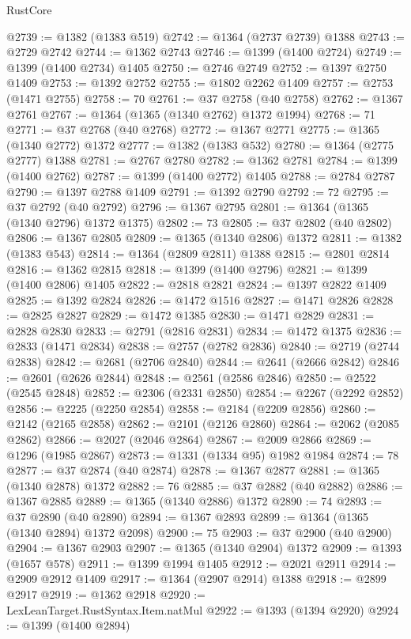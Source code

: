 \begin{lexlean}{RustCore}
\begin{coremodule}
@2739 := @1382 (@1383 @519)
@2742 := @1364 (@2737 @2739) @1388
@2743 := @2729 @2742
@2744 := @1362 @2743
@2746 := @1399 (@1400 @2724)
@2749 := @1399 (@1400 @2734) @1405
@2750 := @2746 @2749
@2752 := @1397 @2750 @1409
@2753 := @1392 @2752
@2755 := @1802 @2262 @1409
@2757 := @2753 (@1471 @2755)
@2758 := 70
@2761 := @37 @2758 (@40 @2758)
@2762 := @1367 @2761
@2767 := @1364 (@1365 (@1340 @2762) @1372 @1994)
@2768 := 71
@2771 := @37 @2768 (@40 @2768)
@2772 := @1367 @2771
@2775 := @1365 (@1340 @2772) @1372
@2777 := @1382 (@1383 @532)
@2780 := @1364 (@2775 @2777) @1388
@2781 := @2767 @2780
@2782 := @1362 @2781
@2784 := @1399 (@1400 @2762)
@2787 := @1399 (@1400 @2772) @1405
@2788 := @2784 @2787
@2790 := @1397 @2788 @1409
@2791 := @1392 @2790
@2792 := 72
@2795 := @37 @2792 (@40 @2792)
@2796 := @1367 @2795
@2801 := @1364 (@1365 (@1340 @2796) @1372 @1375)
@2802 := 73
@2805 := @37 @2802 (@40 @2802)
@2806 := @1367 @2805
@2809 := @1365 (@1340 @2806) @1372
@2811 := @1382 (@1383 @543)
@2814 := @1364 (@2809 @2811) @1388
@2815 := @2801 @2814
@2816 := @1362 @2815
@2818 := @1399 (@1400 @2796)
@2821 := @1399 (@1400 @2806) @1405
@2822 := @2818 @2821
@2824 := @1397 @2822 @1409
@2825 := @1392 @2824
@2826 := @1472 @1516
@2827 := @1471 @2826
@2828 := @2825 @2827
@2829 := @1472 @1385
@2830 := @1471 @2829
@2831 := @2828 @2830
@2833 := @2791 (@2816 @2831)
@2834 := @1472 @1375
@2836 := @2833 (@1471 @2834)
@2838 := @2757 (@2782 @2836)
@2840 := @2719 (@2744 @2838)
@2842 := @2681 (@2706 @2840)
@2844 := @2641 (@2666 @2842)
@2846 := @2601 (@2626 @2844)
@2848 := @2561 (@2586 @2846)
@2850 := @2522 (@2545 @2848)
@2852 := @2306 (@2331 @2850)
@2854 := @2267 (@2292 @2852)
@2856 := @2225 (@2250 @2854)
@2858 := @2184 (@2209 @2856)
@2860 := @2142 (@2165 @2858)
@2862 := @2101 (@2126 @2860)
@2864 := @2062 (@2085 @2862)
@2866 := @2027 (@2046 @2864)
@2867 := @2009 @2866
@2869 := @1296 (@1985 @2867)
@2873 := @1331 (@1334 @95) @1982 @1984
@2874 := 78
@2877 := @37 @2874 (@40 @2874)
@2878 := @1367 @2877
@2881 := @1365 (@1340 @2878) @1372
@2882 := 76
@2885 := @37 @2882 (@40 @2882)
@2886 := @1367 @2885
@2889 := @1365 (@1340 @2886) @1372
@2890 := 74
@2893 := @37 @2890 (@40 @2890)
@2894 := @1367 @2893
@2899 := @1364 (@1365 (@1340 @2894) @1372 @2098)
@2900 := 75
@2903 := @37 @2900 (@40 @2900)
@2904 := @1367 @2903
@2907 := @1365 (@1340 @2904) @1372
@2909 := @1393 (@1657 @578)
@2911 := @1399 @1994 @1405
@2912 := @2021 @2911
@2914 := @2909 @2912 @1409
@2917 := @1364 (@2907 @2914) @1388
@2918 := @2899 @2917
@2919 := @1362 @2918
@2920 := LexLeanTarget.RustSyntax.Item.natMul
@2922 := @1393 (@1394 @2920)
@2924 := @1399 (@1400 @2894)

\end{coremodule}
\end{lexlean}
